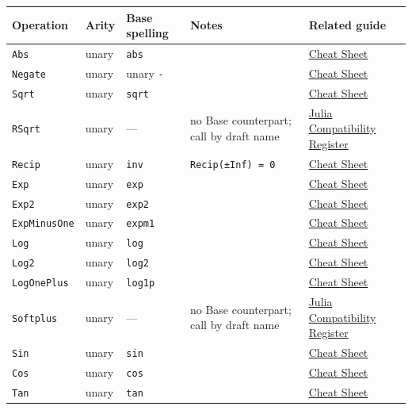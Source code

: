 \begin{table}[h]
\centering
\nopagebreak[3]
\begin{tabulary}{\linewidth}{L L L L L}
\toprule
Operation & Arity & Base spelling & Notes & Related guide \\
\toprule
\texttt{Abs} & unary & \texttt{abs} &  & \href{help\_\allowbreak{}cheat\_\allowbreak{}sheet.md}{Cheat Sheet} \\
\texttt{Negate} & unary & unary \texttt{-} &  & \href{help\_\allowbreak{}cheat\_\allowbreak{}sheet.md}{Cheat Sheet} \\
\texttt{Sqrt} & unary & \texttt{sqrt} &  & \href{help\_\allowbreak{}cheat\_\allowbreak{}sheet.md}{Cheat Sheet} \\
\texttt{RSqrt} & unary & — & no Base counterpart; call by draft name & \href{reference\_\allowbreak{}julia\_\allowbreak{}compat.md}{Julia Compatibility Register} \\
\texttt{Recip} & unary & \texttt{inv} & \texttt{Recip(±Inf) = 0} & \href{help\_\allowbreak{}cheat\_\allowbreak{}sheet.md}{Cheat Sheet} \\
\texttt{Exp} & unary & \texttt{exp} &  & \href{help\_\allowbreak{}cheat\_\allowbreak{}sheet.md}{Cheat Sheet} \\
\texttt{Exp2} & unary & \texttt{exp2} &  & \href{help\_\allowbreak{}cheat\_\allowbreak{}sheet.md}{Cheat Sheet} \\
\texttt{ExpMinusOne} & unary & \texttt{expm1} &  & \href{help\_\allowbreak{}cheat\_\allowbreak{}sheet.md}{Cheat Sheet} \\
\texttt{Log} & unary & \texttt{log} &  & \href{help\_\allowbreak{}cheat\_\allowbreak{}sheet.md}{Cheat Sheet} \\
\texttt{Log2} & unary & \texttt{log2} &  & \href{help\_\allowbreak{}cheat\_\allowbreak{}sheet.md}{Cheat Sheet} \\
\texttt{LogOnePlus} & unary & \texttt{log1p} &  & \href{help\_\allowbreak{}cheat\_\allowbreak{}sheet.md}{Cheat Sheet} \\
\texttt{Softplus} & unary & — & no Base counterpart; call by draft name & \href{reference\_\allowbreak{}julia\_\allowbreak{}compat.md}{Julia Compatibility Register} \\
\texttt{Sin} & unary & \texttt{sin} &  & \href{help\_\allowbreak{}cheat\_\allowbreak{}sheet.md}{Cheat Sheet} \\
\texttt{Cos} & unary & \texttt{cos} &  & \href{help\_\allowbreak{}cheat\_\allowbreak{}sheet.md}{Cheat Sheet} \\
\texttt{Tan} & unary & \texttt{tan} &  & \href{help\_\allowbreak{}cheat\_\allowbreak{}sheet.md}{Cheat Sheet} \\

\end{tabulary}
\end{table}
